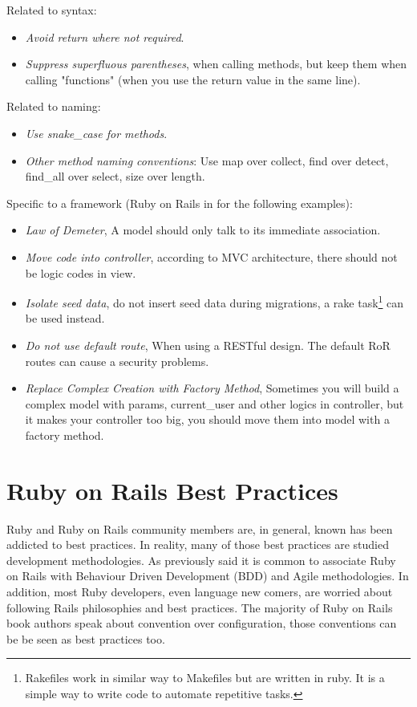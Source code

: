 Related to syntax:
\begin{itemize}
\item \emph{Avoid return where not required}.
\item \emph{Suppress superfluous parentheses}, when calling methods, 
but keep them when calling "functions" (when you use the return value in the same line).
\end{itemize}

Related to naming:
\begin{itemize}
\item \emph{Use snake\_case for methods}.
\item \emph{Other method naming conventions}: Use map over collect, find over detect, find\_all over select, size over length.
\end{itemize}

Specific to a framework (Ruby on Rails in for the following examples):
\begin{itemize}
\item \emph{Law of Demeter}, A model should only talk to its immediate association.
\item \emph{Move code into controller}, according to MVC architecture, there should not be logic codes in view.
\item \emph{Isolate seed data}, do not insert seed data during migrations, a 
rake task\footnote{ 
  Rakefiles work in similar way to Makefiles but are written in ruby. It is a simple way to write code to automate repetitive tasks. 
} can be used instead.
\item \emph{Do not use default route}, When using a RESTful design. The default RoR routes can cause a security problems.
\item \emph{Replace Complex Creation with Factory Method}, Sometimes you will build a complex model with params, current\_user and other logics in controller, but it makes your controller too big, you should move them into model with a factory method.
\end{itemize}




\section{Ruby on Rails Best Practices} \label{sec:ror_best_practives}

Ruby and Ruby on Rails community members are, in general, known has been addicted to best practices.
In reality, many of those best practices are studied development methodologies.
As previously said it is common to associate Ruby on Rails with Behaviour Driven Development (BDD) and Agile methodologies.
In addition, most Ruby developers, even language new comers, are worried about following Rails philosophies and best practices.
The majority of Ruby on Rails book authors speak about convention over configuration,
those conventions can be be seen as best practices too.

